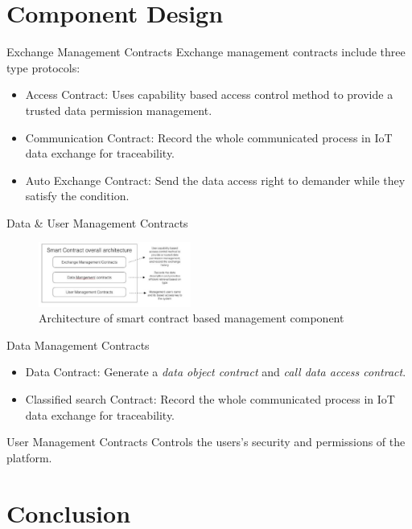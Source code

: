 \documentclass[10pt]{beamer}
\begin{document}
\section{Component Design}

\begin{frame}{Exchange Management Contracts}
	Exchange management contracts include three type protocols:
			\begin{itemize}
			\item Access Contract: Uses capability based access control method to provide a trusted data permission management. 
			\item Communication Contract: Record the whole communicated process in IoT data exchange for traceability.
			\item Auto Exchange Contract: Send the data access right to demander while they satisfy the condition.
			\end{itemize}
\end{frame}

\begin{frame}{Data {\&} User Management Contracts}
	\begin{figure}  
	\includegraphics[width=5cm]{smatcontract_management}    
    \caption{Architecture of smart contract based management component}
    \end{figure}
     \begin{alertblock}{Data Management Contracts}
    		\begin{itemize}
			\item Data Contract: Generate a \emph{data object contract} and \emph{call data access contract}.  
			\item Classified search Contract: Record the whole communicated process in IoT data exchange for traceability.
			\end{itemize}
		\end{alertblock}
	\begin{alertblock}{User Management Contracts}
	Controls the users's security and permissions of the platform. 
	\end{alertblock}		
\end{frame}

\section{Conclusion}
\end{document}
